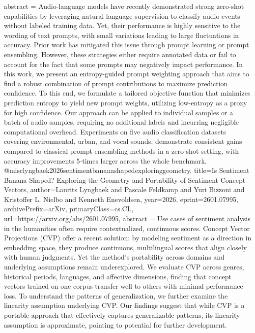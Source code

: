 {      abstract = {Audio-language models have recently demonstrated strong zero-shot capabilities by leveraging natural-language supervision to classify audio events without labeled training data. Yet, their performance is highly sensitive to the wording of text prompts, with small variations leading to large fluctuations in accuracy. Prior work has mitigated this issue through prompt learning or prompt ensembling. However, these strategies either require annotated data or fail to account for the fact that some prompts may negatively impact performance. In this work, we present an entropy-guided prompt weighting approach that aims to find a robust combination of prompt contributions to maximize prediction confidence. To this end, we formulate a tailored objective function that minimizes prediction entropy to yield new prompt weights, utilizing low-entropy as a proxy for high confidence. Our approach can be applied to individual samples or a batch of audio samples, requiring no additional labels and incurring negligible computational overhead. Experiments on five audio classification datasets covering environmental, urban, and vocal sounds, demonstrate consistent gains compared to classical prompt ensembling methods in a zero-shot setting, with accuracy improvements 5-times larger across the whole benchmark.}
}@misc{lyngbaek2026sentimentbananashapedexploringgeometry,
      title={Is Sentiment Banana-Shaped? Exploring the Geometry and Portability of Sentiment Concept Vectors}, 
      author={Laurits Lyngbaek and Pascale Feldkamp and Yuri Bizzoni and Kristoffer L. Nielbo and Kenneth Enevoldsen},
      year={2026},
      eprint={2601.07995},
      archivePrefix={arXiv},
      primaryClass={cs.CL},
      url={https://arxiv.org/abs/2601.07995},
      abstract = {Use cases of sentiment analysis in the humanities often require contextualized, continuous scores. Concept Vector Projections (CVP) offer a recent solution: by modeling sentiment as a direction in embedding space, they produce continuous, multilingual scores that align closely with human judgments. Yet the method's portability across domains and underlying assumptions remain underexplored. We evaluate CVP across genres, historical periods, languages, and affective dimensions, finding that concept vectors trained on one corpus transfer well to others with minimal performance loss. To understand the patterns of generalization, we further examine the linearity assumption underlying CVP. Our findings suggest that while CVP is a portable approach that effectively captures generalizable patterns, its linearity assumption is approximate, pointing to potential for further development.}
}
